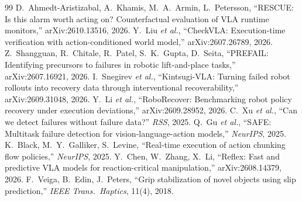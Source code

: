 \documentclass[conference]{IEEEtran}
\begin{document}
\begin{thebibliography}{99}
 D.~Ahmedt-Aristizabal, A.~Khamis, M.~A.~Armin, L.~Petersson, ``RESCUE: Is this alarm worth acting on? Counterfactual evaluation of VLA runtime monitors,'' arXiv:2610.13516, 2026.
 Y.~Liu \emph{et al.}, ``CheckVLA: Execution-time verification with action-conditioned world model,'' arXiv:2607.26789, 2026.
 Z.~Shangguan, R.~Chitale, R.~Patel, S.~K.~Gupta, D.~Seita, ``PREFAIL: Identifying precursors to failures in robotic lift-and-place tasks,'' arXiv:2607.16921, 2026.
 I.~Snegirev \emph{et al.}, ``Kintsugi-VLA: Turning failed robot rollouts into recovery data through interventional recoverability,'' arXiv:2609.31048, 2026.
 Y.~Li \emph{et al.}, ``RoboRecover: Benchmarking robot policy recovery under execution deviations,'' arXiv:2609.28952, 2026.
 C.~Xu \emph{et al.}, ``Can we detect failures without failure data?'' \emph{RSS}, 2025.
 Q.~Gu \emph{et al.}, ``SAFE: Multitask failure detection for vision-language-action models,'' \emph{NeurIPS}, 2025.
 K.~Black, M.~Y.~Galliker, S.~Levine, ``Real-time execution of action chunking flow policies,'' \emph{NeurIPS}, 2025.
 Y.~Chen, W.~Zhang, X.~Li, ``Reflex: Fast and predictive VLA models for reaction-critical manipulation,'' arXiv:2608.14379, 2026.
 F.~Veiga, B.~Edin, J.~Peters, ``Grip stabilization of novel objects using slip prediction,'' \emph{IEEE Trans.\ Haptics}, 11(4), 2018.
\end{thebibliography}
\end{document}
